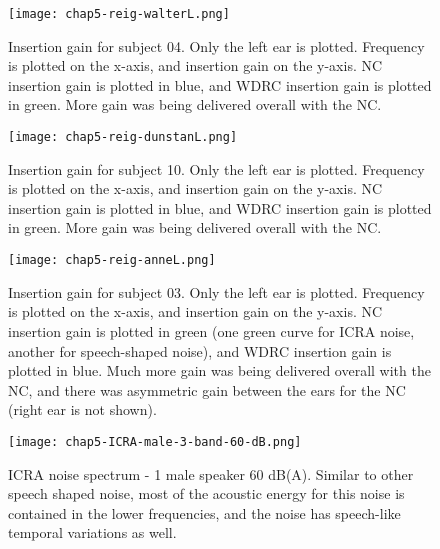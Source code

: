 \begin{figure}[htp]
\begin{center}
\texttt{[image: chap5-reig-walterL.png]}\\
\caption[NCStudy2 insertion gain for subject 04]{Insertion gain for subject 04.  Only the left ear is plotted.  Frequency is plotted on the x-axis, and insertion gain on the y-axis.  NC insertion gain is plotted in blue, and WDRC insertion gain is plotted in green.  More gain was being delivered overall with the NC.}
\label{ch5-reig-walterL}
\end{center}
\end{figure}

\begin{figure}[htp]
\begin{center}
\texttt{[image: chap5-reig-dunstanL.png]}\\
\caption[NCStudy2 insertion gain for subject 10]{Insertion gain for subject 10.  Only the left ear is plotted.  Frequency is plotted on the x-axis, and insertion gain on the y-axis.  NC insertion gain is plotted in blue, and WDRC insertion gain is plotted in green.  More gain was being delivered overall with the NC.}
\label{ch5-reig-dunstanL}
\end{center}
\end{figure}

\begin{figure}[htp]
\begin{center}
\texttt{[image: chap5-reig-anneL.png]}\\
\caption[NCStudy2 insertion gain for subject 03]{Insertion gain for subject 03.  Only the left ear is plotted.  Frequency is plotted on the x-axis, and insertion gain on the y-axis.  NC insertion gain is plotted in green (one green curve for ICRA noise, another for speech-shaped noise), and WDRC insertion gain is plotted in blue.  Much more gain was being delivered overall with the NC, and there was asymmetric gain between the ears for the NC (right ear is not shown).}
\label{ch5-reig-anneL}
\end{center}
\end{figure}

\begin{figure}[htp]
\begin{center}
\texttt{[image: chap5-ICRA-male-3-band-60-dB.png]}\\
\caption[ICRA noise spectrum - 1 male speaker 60 dB(A)]{ICRA noise spectrum - 1 male speaker 60 dB(A).  Similar to other speech shaped noise, most of the acoustic energy for this noise is contained in the lower frequencies, and the noise has speech-like temporal variations as well.}
\label{ch5-ICRAspectrum}
\end{center}
\end{figure}

